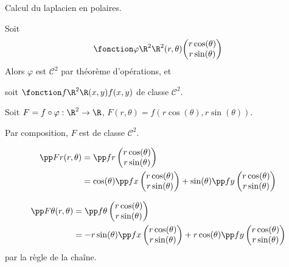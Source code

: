 \begin{exemple}
    Calcul du laplacien en polaires.

    Soit 
    $$\fonction \varphi {\R^2}{\R^2}{(r, \theta)}{\begin{pmatrix} 
        r \cos(\theta) \\
        r \sin (\theta)
    \end{pmatrix}}$$
    Alors $\varphi$ est $\mathscr C^2$ par théorème d'opérations, et 
    
    soit $\fonction f {\R^2}{\R}{(x, y)}{f(x, y)}$ de classe $\mathscr C^2$.

    \svspace Soit $F = f \circ \varphi : \R^2 \to \R$, $F(r, \theta) = f(r \cos(\theta), r \sin(\theta))$.

    Par composition, $F$ est de classe $\mathscr C^2$.

    \begin{align}
        \pp F r (r, \theta) & = \pp f r \begin{pmatrix}
        r \cos(\theta) \\
        r \sin(\theta)
    \end{pmatrix} \\
    & = \cos( \theta) \pp f x \begin{pmatrix}
        r \cos(\theta) \\
        r \sin(\theta)
    \end{pmatrix} + \sin(\theta) \pp f y \begin{pmatrix}
        r \cos(\theta) \\
        r \sin(\theta)
    \end{pmatrix}
    \end{align}

    \begin{align}
        \pp F \theta (r, \theta) & = \pp f \theta \begin{pmatrix}
        r \cos(\theta) \\
        r \sin(\theta)
    \end{pmatrix} \\
    & = - r \sin( \theta) \pp f x \begin{pmatrix}
        r \cos(\theta) \\
        r \sin(\theta)
    \end{pmatrix} + r \cos(\theta) \pp f y \begin{pmatrix}
        r \cos(\theta) \\
        r \sin(\theta)
    \end{pmatrix}
    \end{align} par la règle de la chaîne.


\end{exemple}
